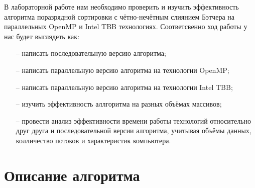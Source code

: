 \documentclass[a4paper,final]{report}
\begin{document}
\begin{spacing}{1.5}
		\par В лабораторной работе нам необходимо проверить и изучить эффективность алгоритма поразрядной сортировки с чётно-нечётным слиянием Бэтчера на параллельных OpenMP и Intel TBB технологиях. 
		Соответсвенно ход работы у нас будет выглядеть как:
		\begin{itemize} 
			\item[--] написать последовательную версию алгоритма;
			\item[--] написать параллельную версию алгоритма на технологии OpenMP;
			\item[--] написать параллельную версию алгоритма на технологии Intel TBB;
			\item[--] изучить эффективность аллгоритма на разных объёмах массивов;
			\item[--] провести анализ эффективности времени работы технологий относительно друг друга и последовательной версии алгоритма, учитывая объёмы данных, колличество потоков и характеристик компьютера.
		\end{itemize}
		
		\newpage
		
		\section{Описание алгоритма}
		

\end{spacing}
\end{document}
